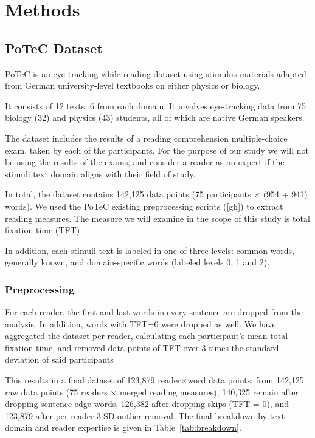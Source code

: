 \documentclass[10pt,letterpaper]{article}
\begin{document}
\section{Methods}

\subsection{PoTeC Dataset}

PoTeC is an eye-tracking-while-reading dataset using stimulus materials adapted from German university-level textbooks on either physics or biology.

It consists of 12 texts, 6 from each domain. It involves eye-tracking data from 75 biology (32) and physics (43) students, all of which are native German speakers.

The dataset includes the results of a reading comprehension multiple-choice exam, taken by each of the participants.
For the purpose of our study we will not be using the results of the exams, and consider a reader as an expert if the stimuli text domain aligns with their field of study.

In total, the dataset contains 142,125 data points (75 participants $\times$ (954 + 941) words). We used the PoTeC existing preprocessing scripts ([gh]) to extract reading measures. The measure we will examine in the scope of this study is total fixation time (TFT)

In addition, each stimuli text is labeled in one of three levels: common words, generally known, and domain-specific words (labeled levels 0, 1 and 2).

\subsubsection{Preprocessing}

For each reader, the first and last words in every sentence are dropped from the analysis. In addition, words with TFT=0 were dropped as well.
We have aggregated the dataset per-reader, calculating each participant's mean total-fixation-time, and removed data points of TFT over 3 times the standard deviation of said participants

This results in a final dataset of 123,879 reader$\times$word data points: from 142,125 raw data points (75 readers $\times$ merged reading measures), 140,325 remain after dropping sentence-edge words, 126,382 after dropping skips (TFT = 0), and 123,879 after per-reader 3$\cdot$SD outlier removal. The final breakdown by text domain and reader expertise is given in Table~\ref{tab:breakdown}.
\end{document}
